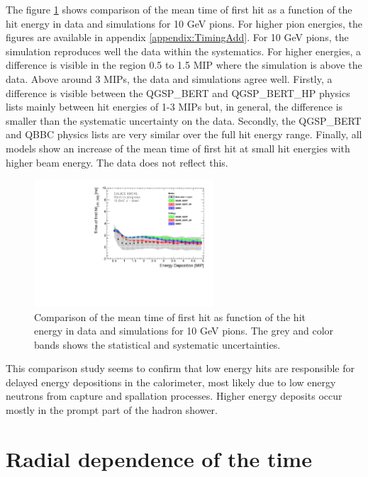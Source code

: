 The figure \ref{fig:Energy_SimData_10GeV} shows comparison of the mean time of first hit as a function of the hit energy in data and simulations for 10 GeV pions. For higher pion energies, the figures are available in appendix \ref{appendix:TimingAdd}. For 10 GeV pions, the simulation reproduces well the data within the systematics. For higher energies, a difference is visible in the region 0.5 to 1.5 MIP where the simulation is above the data. Above around 3 MIPs, the data and simulations agree well. Firstly, a difference is visible between the QGSP\_BERT and QGSP\_BERT\_HP physics lists mainly between hit energies of 1-3 MIPs but, in general, the difference is smaller than the systematic uncertainty on the data. Secondly, the QGSP\_BERT and QBBC physics lists are very similar over the full hit energy range. Finally, all models show an increase of the mean time of first hit at small hit energies with higher beam energy. The data does not reflect this.

\begin{figure}[htbp!]
	\centering
	\includegraphics[width=0.6\textwidth]{../Thesis_Plots/Timing/Pions/Plots/ComparisonToSim/Time_Energy_10GeV.pdf}
	\caption{Comparison of the mean time of first hit as function of the hit energy in data and simulations for 10 GeV pions. The grey and color bands shows the statistical and systematic uncertainties.}
	\label{fig:Energy_SimData_10GeV}
\end{figure}

This comparison study seems to confirm that low energy hits are responsible for delayed energy depositions in the calorimeter, most likely due to low energy neutrons from capture and spallation processes. Higher energy deposits occur mostly in the prompt part of the hadron shower.

\section{Radial dependence of the time}
\label{sec:RadialTime}

